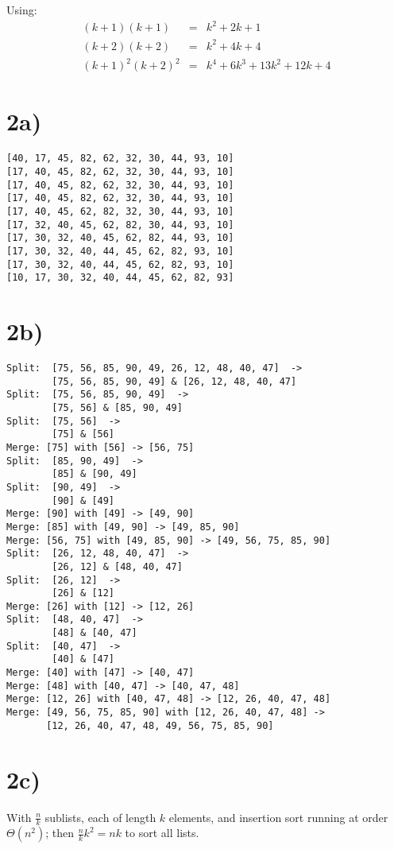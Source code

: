 \documentclass[a4paper,11pt]{article}
\begin{document}
Using:
\begin{eqnarray}
(k + 1)(k + 1) &=& k^2 + 2k + 1 \\
(k + 2)(k + 2) &=& k^2 + 4k + 4 \\
(k + 1)^2 (k + 2)^2 &=& k^4 + 6k^3 + 13k^2 + 12k + 4
\end{eqnarray}



\section*{2a)}
\begin{verbatim}
[40, 17, 45, 82, 62, 32, 30, 44, 93, 10]
[17, 40, 45, 82, 62, 32, 30, 44, 93, 10]
[17, 40, 45, 82, 62, 32, 30, 44, 93, 10]
[17, 40, 45, 82, 62, 32, 30, 44, 93, 10]
[17, 40, 45, 62, 82, 32, 30, 44, 93, 10]
[17, 32, 40, 45, 62, 82, 30, 44, 93, 10]
[17, 30, 32, 40, 45, 62, 82, 44, 93, 10]
[17, 30, 32, 40, 44, 45, 62, 82, 93, 10]
[17, 30, 32, 40, 44, 45, 62, 82, 93, 10]
[10, 17, 30, 32, 40, 44, 45, 62, 82, 93]
\end{verbatim}

\section*{2b)}
\begin{verbatim}
Split:  [75, 56, 85, 90, 49, 26, 12, 48, 40, 47]  -> 
        [75, 56, 85, 90, 49] & [26, 12, 48, 40, 47]
Split:  [75, 56, 85, 90, 49]  -> 
        [75, 56] & [85, 90, 49]
Split:  [75, 56]  -> 
        [75] & [56]
Merge: [75] with [56] -> [56, 75]
Split:  [85, 90, 49]  -> 
        [85] & [90, 49]
Split:  [90, 49]  -> 
        [90] & [49]
Merge: [90] with [49] -> [49, 90]
Merge: [85] with [49, 90] -> [49, 85, 90]
Merge: [56, 75] with [49, 85, 90] -> [49, 56, 75, 85, 90]
Split:  [26, 12, 48, 40, 47]  -> 
        [26, 12] & [48, 40, 47]
Split:  [26, 12]  -> 
        [26] & [12]
Merge: [26] with [12] -> [12, 26]
Split:  [48, 40, 47]  -> 
        [48] & [40, 47]
Split:  [40, 47]  -> 
        [40] & [47]
Merge: [40] with [47] -> [40, 47]
Merge: [48] with [40, 47] -> [40, 47, 48]
Merge: [12, 26] with [40, 47, 48] -> [12, 26, 40, 47, 48]
Merge: [49, 56, 75, 85, 90] with [12, 26, 40, 47, 48] ->
       [12, 26, 40, 47, 48, 49, 56, 75, 85, 90]
\end{verbatim}

\section*{2c)}
With $\frac{n}{k}$ sublists, each of length $k$ elements, and insertion sort running at order $\Theta (n^{2})$; then $\frac{n}{k} k^2 = nk $ to sort all lists.
\end{document}
